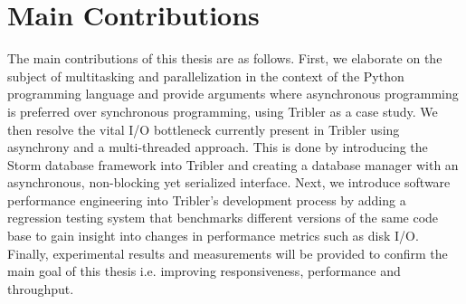 \section{Main Contributions}
The main contributions of this thesis are as follows.
First, we elaborate on the subject of multitasking and parallelization in the context of the Python programming language and provide arguments where asynchronous programming is preferred over synchronous programming, using Tribler as a case study.
We then resolve the vital I/O bottleneck currently present in Tribler using asynchrony and a multi-threaded approach.
This is done by introducing the Storm database framework into Tribler and creating a database manager with an asynchronous, non-blocking yet serialized interface.
Next, we introduce software performance engineering into Tribler's development process by adding a regression testing system that benchmarks different versions of the same code base to gain insight into changes in performance metrics such as disk I/O.
Finally, experimental results and measurements will be provided to confirm the main goal of this thesis i.e. improving responsiveness, performance and throughput.
